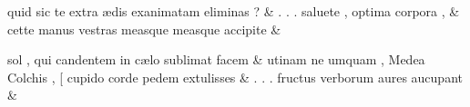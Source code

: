 \documentclass[12pt,onecolumn,twoside,a4paper]{memoir}
\begin{document}
\begin{pairs}
\begin{Leftside}
                              quid
                              sic
                              te
                              extra
                              ædis
                              exanimatam
                              eliminas
                              ? \&
                         \stanza {}.
                              .
                              .
                              saluete
                              ,
                              optima
                              corpora
                              , & 
                     cette
                              manus
                              vestras
                              measque
                              {measque}
                              accipite \&

                         \stanza {}
                     sol
                              ,
                              qui
                              candentem
                              in
                              cælo
                              sublimat
                              facem \&
                         \stanza {}
                     utinam
                              ne
                              umquam
                              ,
                              Medea
                              Colchis
                              ,
                              [
                              cupido
                              corde
                              pedem
                              extulisses \&
                         \stanza {}
                     .
                              .
                              .
                              fructus
                              verborum
                              aures
                              aucupant \&
                     
                  \endnumbering
		\end{Leftside}
                  \begin{Rightside}
			\beginnumbering
			\numberstanzafalse
                     

\end{Rightside}
\end{pairs}
\end{document}
